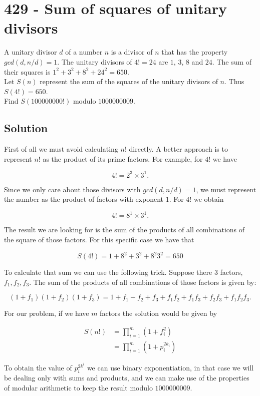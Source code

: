 \chapter*{429 - Sum of squares of unitary divisors}

A unitary divisor $d$ of a number $n$ is a divisor of $n$ that has the property $gcd(d, n/d) = 1$.
The unitary divisors of $4! = 24$ are $1$, $3$, $8$ and $24$.
The sum of their squares is $1^2 + 3^2 + 8^2 + 24^2 = 650.$ \\

Let $S(n)$ represent the sum of the squares of the unitary divisors of $n$. Thus $S(4!)=650$. \\

Find $S(100000000!)$ modulo $1000000009$.

\section*{Solution}

First of all we must avoid calculating $n!$ directly. A better approach is to represent $n!$ as the product of its prime factors. For example, for $4!$ we have

$$
4! = 2^3 \times 3^1.
$$

Since we only care about those divisors with $gcd(d,n/d) = 1$, we must represent the number as the product of factors with exponent $1$. For $4!$ we obtain

$$
4! = 8^1 \times 3^1.
$$

The result we are looking for is the sum of the products of all combinations of the square of those factors. For this specific case we have that

$$
S(4!) = 1 + 8^2 + 3^2 + 8^2 3^2 = 650
$$

To calculate that sum we can use the following trick. Suppose there $3$ factors, $f_1, f_2, f_3$. The sum of the products of all combinations of those factors is given by:

$$
(1 + f_1)(1 + f_2)(1 + f_3) = 1 + f_1 + f_2 + f_3 + f_1f_2 + f_1f_3 + f_2f_3 + f_1f_2f_3.
$$

For our problem, if we have $m$ factors the solution would be given by

\begin{align*}
    S(n!) &= \prod_{i=1}^m (1 + f_i^2)\\
    &= \prod_{i=1}^m (1 + p_i^{2k_i}) 
\end{align*}


To obtain the value of $p_i^{2k^i}$ we can use binary exponentiation, in that case we will be dealing only with sums and products, and we can make use of the properties of modular arithmetic to keep the result modulo  $1000000009$.